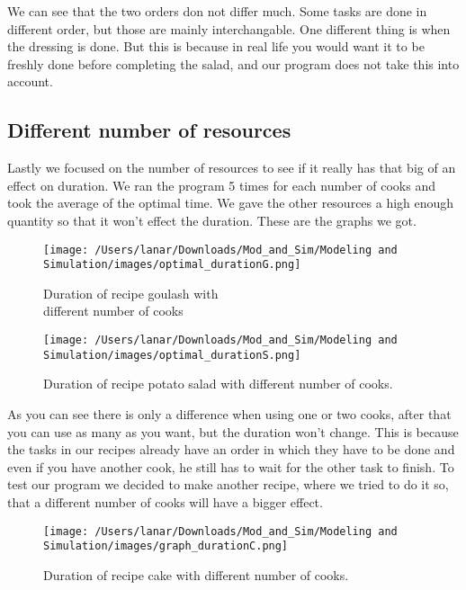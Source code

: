 We can see that the two orders don not differ much. Some tasks are done in different order, but those are mainly interchangable. One different thing is when the dressing is done. 
But this is because in real life you would want it to be freshly done before completing the salad, and our program does not take this into account. 

\subsection{Different number of resources}
Lastly we focused on the number of resources to see if it really has that big of an effect on duration. 
We ran the program 5 times for each number of cooks and took the average of the optimal time. We gave the other resources a high enough quantity so that it won't effect the duration.
These are the graphs we got.

\begin{figure}[H]
    \centering
    \begin{minipage}{.5\textwidth}
      \centering
      \texttt{[image: /Users/lanar/Downloads/Mod\_and\_Sim/Modeling and Simulation/images/optimal\_durationG.png]}
      \caption{Duration of recipe goulash with \\ different number of cooks}
      \label{fig6}
    \end{minipage}%
    \begin{minipage}{.5\textwidth}
      \centering
      \texttt{[image: /Users/lanar/Downloads/Mod\_and\_Sim/Modeling and Simulation/images/optimal\_durationS.png]}
      \caption{Duration of recipe potato salad with different number of cooks.}
      \label{fig7}
    \end{minipage}
\end{figure}

As you can see there is only a difference when using one or two cooks, after that you can use as many as you want, but the duration won't change. 
This is because the tasks in our recipes already have an order in which they have to be done and even if you have another cook, he still has to wait for the other task to finish. 
To test our program we decided to make another recipe, where we tried to do it so, that a different number of cooks will have a bigger effect.

\begin{figure}[H]
    \centerline{\texttt{[image: /Users/lanar/Downloads/Mod\_and\_Sim/Modeling and Simulation/images/graph\_durationC.png]}}
    \caption{Duration of recipe cake with different number of cooks.}
    \label{fig8}
\end{figure}

